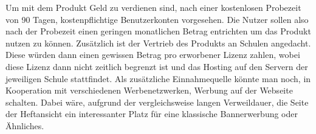 Um mit dem Produkt Geld zu verdienen sind, nach einer kostenlosen Probezeit von 90 Tagen, kostenpflichtige Benutzerkonten vorgesehen. Die Nutzer sollen also nach der Probezeit einen geringen monatlichen Betrag entrichten um das Produkt nutzen zu können. Zusätzlich ist der Vertrieb des Produkts an Schulen angedacht. Diese würden dann einen gewissen Betrag pro erworbener Lizenz zahlen, wobei diese Lizenz dann nicht zeitlich begrenzt ist und das Hosting auf den Servern der jeweiligen Schule stattfindet. Als zusätzliche Einnahmequelle könnte man noch, in Kooperation mit verschiedenen Werbenetzwerken, Werbung auf der Webseite schalten. Dabei wäre, aufgrund der vergleichsweise langen Verweildauer, die Seite der Heftansicht ein interessanter Platz für eine klassische Bannerwerbung oder Ähnliches.
